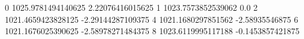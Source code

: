 0 1025.9781494140625 2.22076416015625
1 1023.7573852539062 0.0
2 1021.4659423828125 -2.29144287109375
4 1021.1680297851562 -2.58935546875
6 1021.1676025390625 -2.58978271484375
8 1023.6119995117188 -0.1453857421875

